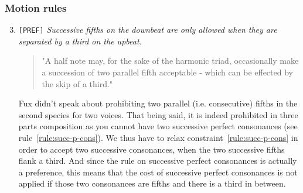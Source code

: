\subsubsection{Motion rules}
\begin{enumerate}[wide, label=\bfseries 2.P\arabic*]
\setcounter{enumi}{2} 
    \item \texttt{[PREF]} \textit{Successive fifths on the downbeat are only allowed when they are separated by a third on the upbeat.} \label{rule:succ-fifths-flanking-third}    
    \begin{quotation}
        "A half note may, for the sake of the harmonic triad, occasionally make a succession of two parallel fifth acceptable - which can be effected by the skip of a third."
        \textcite[p.86]{GaPEng}
    \end{quotation}
    Fux didn't speak about prohibiting two parallel (i.e. consecutive) fifths in the second species for two voices. That being said, it is indeed prohibited in three parts composition as you cannot have two successive perfect consonances (see rule~\ref{rule:succ-p-cons}). We thus have to relax constraint~\ref{rule:succ-p-cons} in order to accept two successive consonances, when the two successive fifths flank a third. And since the rule on successive perfect consonances is actually a preference, this means that the cost of successive perfect consonances is not applied if those two consonances are fifths and there is a third in between.


\end{enumerate}

